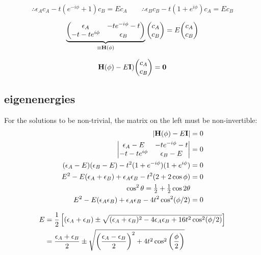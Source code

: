 \documentclass[10pt, a4paper, twocolumn]{article}
\begin{document}
\[\therefore \epsilon _Ac_A-t(e^{-i\phi}+1)c_B=Ec_A
\qquad
\therefore \epsilon _Bc_B-t(1+e^{i\phi})c_A=Ec_B \]

\[ \underbrace{
\begin{pmatrix}
\epsilon _A & -te^{-i\phi}-t
\\ -t-te^{i\phi} & \epsilon _B
\end{pmatrix}}_{\equiv \vb H (\phi)}
\mqty(c_A\\c_B) = E \mqty(c_A\\c_B) \]

\[\vb H (\phi) -E\vb I)\mqty(c_A\\c_B) = \vb 0\]

\subsection{eigenenergies}

For the solutions to be non-trivial, the matrix on the left must be non-invertible:
\begin{equation*}
\begin{aligned}
\qty|\vb H (\phi) - E\vb I| &=0
\\ \begin{vmatrix}
\epsilon _A -E & -te^{-i\phi} -t
\\ -t-te^{i\phi} & \epsilon _B-E \end{vmatrix} &= 0
\\ (\epsilon _A-E) (\epsilon _B-E)
-t^2(1+e^{-i\phi})(1+e^{i\phi}) &=0
\\ E^2 -E(\epsilon _A + \epsilon _B) + \epsilon _A
\epsilon _B - t^2(2+2\cos \phi) &=0
\\ \qquad \cos ^2\theta = \tfrac12 +\tfrac12\cos 2\theta
\\ E^2 -E(\epsilon _A \epsilon _B)
+ \epsilon _A\epsilon _B - 4t^2 \cos ^2(\phi/2) &=0
\end{aligned}
\end{equation*}

\begin{equation*}
\begin{aligned}
E &= \frac12 \left[
(\epsilon _A + \epsilon _B) \pm
\sqrt{(\epsilon _A + \epsilon _B)^2
-4\epsilon _A \epsilon _B
+16t^2\cos ^2 (\phi/2)} \right]
\\&=
\frac{\epsilon _A + \epsilon _B}{2} \pm
\sqrt{\qty(\frac{\epsilon _A-\epsilon _B}{2})^2
+ 4t^2\cos ^2 \qty(\frac{\phi}{2})}
\end{aligned}
\end{equation*}
\end{document}
